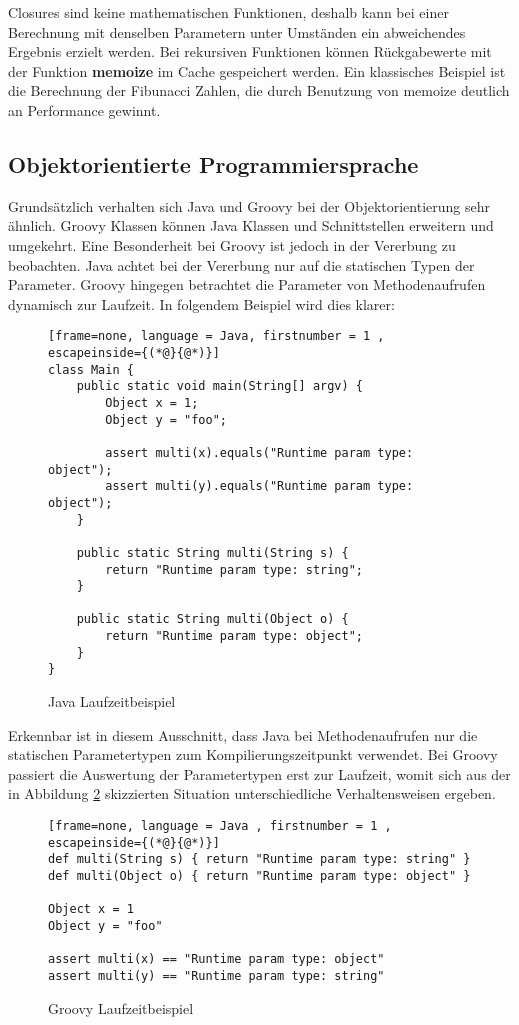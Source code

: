 
Closures sind keine mathematischen Funktionen, deshalb kann bei einer Berechnung mit denselben Parametern unter Umständen ein abweichendes Ergebnis erzielt werden. 
Bei rekursiven Funktionen können Rückgabewerte mit der Funktion \textbf{memoize} im Cache gespeichert werden. 
Ein klassisches Beispiel ist die Berechnung der Fibunacci Zahlen, die durch Benutzung von memoize deutlich an Performance gewinnt.


\subsection{Objektorientierte Programmiersprache}
Grundsätzlich verhalten sich Java und Groovy bei der Objektorientierung sehr ähnlich. 
Groovy Klassen können Java Klassen und Schnittstellen erweitern und umgekehrt.
Eine Besonderheit bei Groovy ist jedoch in der Vererbung zu beobachten.
Java achtet bei der Vererbung nur auf die statischen Typen der Parameter. 
Groovy hingegen betrachtet die Parameter von Methodenaufrufen dynamisch zur Laufzeit. 
In folgendem Beispiel wird dies klarer:


\begin{figure}[hbt!]
\begin{lstlisting}[frame=none, language = Java, firstnumber = 1 , escapeinside={(*@}{@*)}]
class Main {
	public static void main(String[] argv) {
		Object x = 1;
		Object y = "foo";
		
		assert multi(x).equals("Runtime param type: object");
		assert multi(y).equals("Runtime param type: object");
	}
	
	public static String multi(String s) {
		return "Runtime param type: string";
	}
	
	public static String multi(Object o) {
		return "Runtime param type: object";
	}
}
\end{lstlisting}

\caption{Java Laufzeitbeispiel}
\label{code:java-runtime}
\end{figure}


Erkennbar ist in diesem Ausschnitt, dass Java bei Methodenaufrufen nur die statischen Parametertypen zum Kompilierungszeitpunkt verwendet.
Bei Groovy passiert die Auswertung der Parametertypen erst zur Laufzeit, womit sich aus der in Abbildung \ref{code:groovy-runtime} skizzierten Situation unterschiedliche Verhaltensweisen ergeben.


\begin{figure}[hbt!]
\begin{lstlisting}[frame=none, language = Java , firstnumber = 1 , escapeinside={(*@}{@*)}]
def multi(String s) { return "Runtime param type: string" }
def multi(Object o) { return "Runtime param type: object" }

Object x = 1
Object y = "foo"

assert multi(x) == "Runtime param type: object"
assert multi(y) == "Runtime param type: string"
\end{lstlisting}

\caption{Groovy Laufzeitbeispiel}
\label{code:groovy-runtime}
\end{figure}



